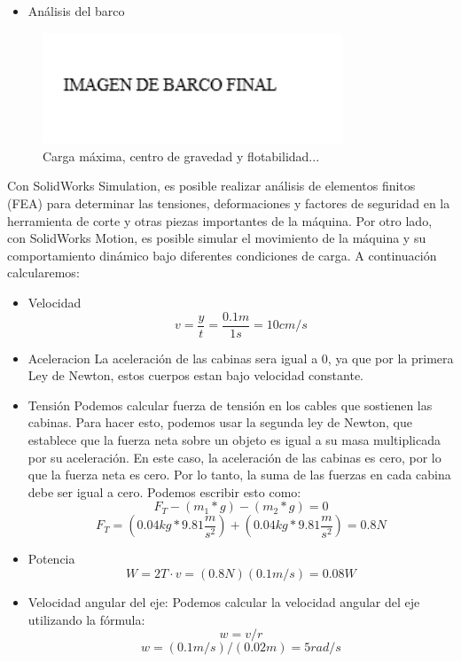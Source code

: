 \documentclass[a4paper,letterpaper]{article}
\begin{document}
\begin{itemize}
	\item Análisis del barco
\end{itemize}
\begin{figure}[H]
	\centering
	\includegraphics[width=0.8\textwidth]{imgbarcofinal.png}
	\caption{Carga máxima, centro de gravedad y flotabilidad...}
	\label{fig:imagen3}
\end{figure}
\newpage
Con SolidWorks Simulation, es posible realizar análisis de elementos finitos (FEA) para determinar las tensiones, deformaciones y factores de seguridad en la herramienta de corte y otras piezas importantes de la máquina.
Por otro lado, con SolidWorks Motion, es posible simular el movimiento de la máquina y su comportamiento dinámico bajo diferentes condiciones de carga.
\newline
A continuación calcularemos:

\begin{itemize}
	\item Velocidad
	      \newline
	      $$v=\frac{y}{t}=\frac{0.1m}{1s}=10cm/s$$
	\item Aceleracion
	      \newline
	      La aceleración de las cabinas sera igual a 0, ya que por la primera Ley de Newton, estos cuerpos
	      estan bajo velocidad constante.
	\item Tensión
	      \newline
	      Podemos calcular fuerza de tensión en los cables que sostienen las cabinas. Para hacer esto, podemos usar la segunda ley de Newton, que establece que la fuerza neta sobre un objeto es igual a su masa multiplicada por su aceleración. En este caso, la aceleración de las cabinas es cero, por lo que la fuerza neta es cero. Por lo tanto, la suma de las fuerzas en cada cabina debe ser igual a cero. Podemos escribir esto como:
	      \newline
	      $$F_{T}-\left ( m_{1}*g \right )-\left ( m_{2}*g \right )=0$$
	      $$F_{T}=\left ( 0.04kg*9.81\frac{m}{{s}^2} \right )+\left ( 0.04kg*9.81\frac{m}{{s}^2} \right )=0.8N$$
	\item Potencia
	      $$W=2T\cdot v=\left ( 0.8N \right )\left ( 0.1m/s \right )=0.08W$$
	\item Velocidad angular del eje:
	      \newline
	      Podemos calcular la velocidad angular del eje utilizando la fórmula:
	      \newline
	      $$w = v/r$$
	      $$w =\left ( 0.1m/s \right )/\left ( 0.02m \right )=5 rad/s$$
\end{itemize}
\end{document}
